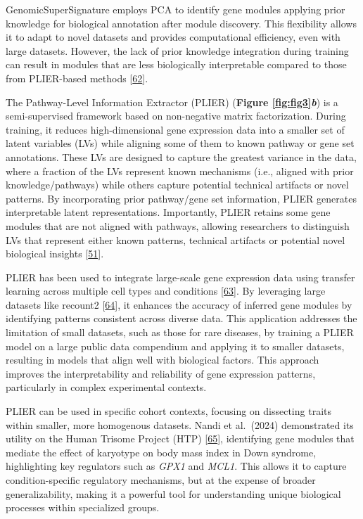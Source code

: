 GenomicSuperSignature employs PCA to identify gene modules applying prior knowledge for biological annotation after module discovery.
This flexibility allows it to adapt to novel datasets and provides computational efficiency, even with large datasets.
However, the lack of prior knowledge integration during training can result in modules that are less biologically interpretable compared to those from PLIER-based methods {[}\protect\hyperlink{ref-X4fhSCkz}{62}{]}.

The Pathway-Level Information Extractor (PLIER) (\textbf{Figure \ref{fig:fig3}\emph{b}}) is a semi-supervised framework based on non-negative matrix factorization.
During training, it reduces high-dimensional gene expression data into a smaller set of latent variables (LVs) while aligning some of them to known pathway or gene set annotations.
These LVs are designed to capture the greatest variance in the data, where a fraction of the LVs represent known mechanisms (i.e., aligned with prior knowledge/pathways) while others capture potential technical artifacts or novel patterns.
By incorporating prior pathway/gene set information, PLIER generates interpretable latent representations.
Importantly, PLIER retains some gene modules that are not aligned with pathways, allowing researchers to distinguish LVs that represent either known patterns, technical artifacts or potential novel biological insights {[}\protect\hyperlink{ref-dg9nKuy0}{51}{]}.

PLIER has been used to integrate large-scale gene expression data using transfer learning across multiple cell types and conditions {[}\protect\hyperlink{ref-14rnBunuZ}{63}{]}.
By leveraging large datasets like recount2 {[}\protect\hyperlink{ref-6SPTvFXq}{64}{]}, it enhances the accuracy of inferred gene modules by identifying patterns consistent across diverse data.
This application addresses the limitation of small datasets, such as those for rare diseases, by training a PLIER model on a large public data compendium and applying it to smaller datasets, resulting in models that align well with biological factors.
This approach improves the interpretability and reliability of gene expression patterns, particularly in complex experimental contexts.

PLIER can be used in specific cohort contexts, focusing on dissecting traits within smaller, more homogenous datasets.
Nandi et al.~(2024) demonstrated its utility on the Human Trisome Project (HTP) {[}\protect\hyperlink{ref-v5DtVejF}{65}{]}, identifying gene modules that mediate the effect of karyotype on body mass index in Down syndrome, highlighting key regulators such as \emph{GPX1} and \emph{MCL1}.
This allows it to capture condition-specific regulatory mechanisms, but at the expense of broader generalizability, making it a powerful tool for understanding unique biological processes within specialized groups.

